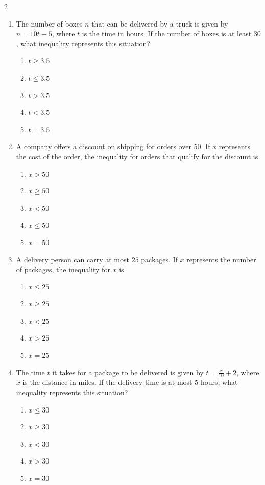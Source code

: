 \documentclass[10pt]{article}
\begin{document}
\begin{multicols}{2}
\begin{enumerate}[label=\textbf{Q\arabic*.}, leftmargin=*, itemsep=6pt, parsep=0pt]
  \item \small The number of boxes $n$ that can be delivered by a truck is given by $n = 10t - 5$, where $t$ is the time in hours. If the number of boxes is at least $30$, what inequality represents this situation?
  \begin{enumerate}[label=(\Alph*), leftmargin=0.6cm, nosep, itemsep=2pt]
    \item $t \geq 3.5$
    \item $t \leq 3.5$
    \item $t > 3.5$
    \item $t < 3.5$
    \item $t = 3.5$
  \end{enumerate}

  \item \small A company offers a discount on shipping for orders over $50$. If $x$ represents the cost of the order, the inequality for orders that qualify for the discount is
  \begin{enumerate}[label=(\Alph*), leftmargin=0.6cm, nosep, itemsep=2pt]
    \item $x > 50$
    \item $x \geq 50$
    \item $x < 50$
    \item $x \leq 50$
    \item $x = 50$
  \end{enumerate}

  \item \small A delivery person can carry at most $25$ packages. If $x$ represents the number of packages, the inequality for $x$ is
  \begin{enumerate}[label=(\Alph*), leftmargin=0.6cm, nosep, itemsep=2pt]
    \item $x \leq 25$
    \item $x \geq 25$
    \item $x < 25$
    \item $x > 25$
    \item $x = 25$
  \end{enumerate}

  \item \small The time $t$ it takes for a package to be delivered is given by $t = \frac{x}{10} + 2$, where $x$ is the distance in miles. If the delivery time is at most $5$ hours, what inequality represents this situation?
  \begin{enumerate}[label=(\Alph*), leftmargin=0.6cm, nosep, itemsep=2pt]
    \item $x \leq 30$
    \item $x \geq 30$
    \item $x < 30$
    \item $x > 30$
    \item $x = 30$
  \end{enumerate}


\end{enumerate}
\end{multicols}
\end{document}
